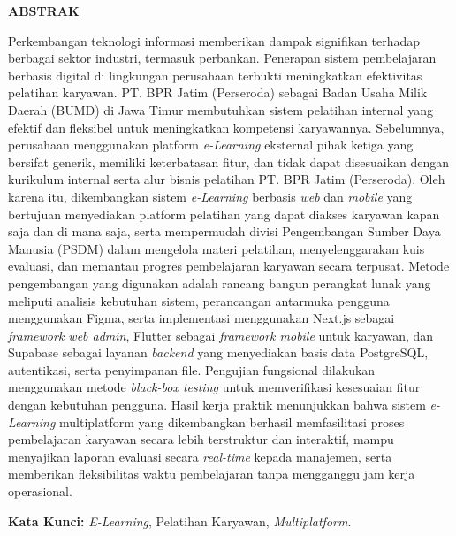 \begin{center}
    {\fontsize{14pt}{16pt}\selectfont\textbf{ABSTRAK}\par}
    \vspace{0.8cm}
\end{center}

Perkembangan teknologi informasi memberikan dampak signifikan terhadap berbagai sektor industri, termasuk perbankan. Penerapan sistem pembelajaran berbasis digital di lingkungan perusahaan terbukti meningkatkan efektivitas pelatihan karyawan. PT. BPR Jatim (Perseroda) sebagai Badan Usaha Milik Daerah (BUMD) di Jawa Timur membutuhkan sistem pelatihan internal yang efektif dan fleksibel untuk meningkatkan kompetensi karyawannya. Sebelumnya, perusahaan menggunakan platform \textit{e-Learning} eksternal pihak ketiga yang bersifat generik, memiliki keterbatasan fitur, dan tidak dapat disesuaikan dengan kurikulum internal serta alur bisnis pelatihan PT. BPR Jatim (Perseroda). Oleh karena itu, dikembangkan sistem \textit{e-Learning} berbasis \textit{web} dan \textit{mobile} yang bertujuan menyediakan platform pelatihan yang dapat diakses karyawan kapan saja dan di mana saja, serta mempermudah divisi Pengembangan Sumber Daya Manusia (PSDM) dalam mengelola materi pelatihan, menyelenggarakan kuis evaluasi, dan memantau progres pembelajaran karyawan secara terpusat. Metode pengembangan yang digunakan adalah rancang bangun perangkat lunak yang meliputi analisis kebutuhan sistem, perancangan antarmuka pengguna menggunakan Figma, serta implementasi menggunakan Next.js sebagai \textit{framework web admin}, Flutter sebagai \textit{framework mobile} untuk karyawan, dan Supabase sebagai layanan \textit{backend} yang menyediakan basis data PostgreSQL, autentikasi, serta penyimpanan file. Pengujian fungsional dilakukan menggunakan metode \textit{black-box testing} untuk memverifikasi kesesuaian fitur dengan kebutuhan pengguna. Hasil kerja praktik menunjukkan bahwa sistem \textit{e-Learning} multiplatform yang dikembangkan berhasil memfasilitasi proses pembelajaran karyawan secara lebih terstruktur dan interaktif, mampu menyajikan laporan evaluasi secara \textit{real-time} kepada manajemen, serta memberikan fleksibilitas waktu pembelajaran tanpa mengganggu jam kerja operasional.

\vspace{1cm}
\noindent \textbf{Kata Kunci:} \textit{E-Learning}, Pelatihan Karyawan, \textit{Multiplatform}.

\newpage
